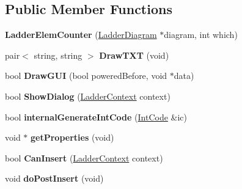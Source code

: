 \subsection*{Public Member Functions}
\begin{DoxyCompactItemize}
\item 
\hypertarget{class_ladder_elem_counter_a8c4fbb3767980abde81e159f0c8f5f48}{{\bfseries Ladder\-Elem\-Counter} (\hyperlink{class_ladder_diagram}{Ladder\-Diagram} $\ast$diagram, int which)}\label{class_ladder_elem_counter_a8c4fbb3767980abde81e159f0c8f5f48}

\item 
\hypertarget{class_ladder_elem_counter_a2796b6525c346b7f6d556e7b9c697faa}{pair$<$ string, string $>$ {\bfseries Draw\-T\-X\-T} (void)}\label{class_ladder_elem_counter_a2796b6525c346b7f6d556e7b9c697faa}

\item 
\hypertarget{class_ladder_elem_counter_ae593472f1021d3b51f2dbdc3e401eab4}{bool {\bfseries Draw\-G\-U\-I} (bool powered\-Before, void $\ast$data)}\label{class_ladder_elem_counter_ae593472f1021d3b51f2dbdc3e401eab4}

\item 
\hypertarget{class_ladder_elem_counter_aa9599ec16c2db266f40e3da5a12709ef}{bool {\bfseries Show\-Dialog} (\hyperlink{struct_ladder_context}{Ladder\-Context} context)}\label{class_ladder_elem_counter_aa9599ec16c2db266f40e3da5a12709ef}

\item 
\hypertarget{class_ladder_elem_counter_a3706168df65c8392e03bbacba57b6544}{bool {\bfseries internal\-Generate\-Int\-Code} (\hyperlink{class_int_code}{Int\-Code} \&ic)}\label{class_ladder_elem_counter_a3706168df65c8392e03bbacba57b6544}

\item 
\hypertarget{class_ladder_elem_counter_a7d6eb5b4b91f67bdd6e7bab8bf3feb84}{void $\ast$ {\bfseries get\-Properties} (void)}\label{class_ladder_elem_counter_a7d6eb5b4b91f67bdd6e7bab8bf3feb84}

\item 
\hypertarget{class_ladder_elem_counter_a2baf2b94e2ac2a2eb7102fad244f0986}{bool {\bfseries Can\-Insert} (\hyperlink{struct_ladder_context}{Ladder\-Context} context)}\label{class_ladder_elem_counter_a2baf2b94e2ac2a2eb7102fad244f0986}

\item 
\hypertarget{class_ladder_elem_counter_a5c3cf928e49af958077ed23c76650596}{void {\bfseries do\-Post\-Insert} (void)}\label{class_ladder_elem_counter_a5c3cf928e49af958077ed23c76650596}


\end{DoxyCompactItemize}
